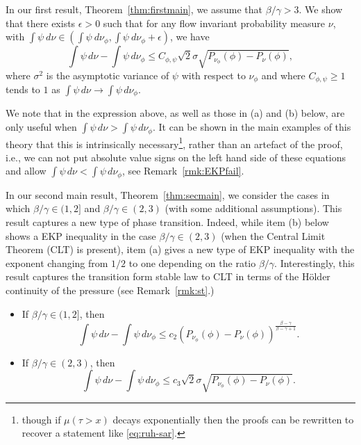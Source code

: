 \documentclass[12pt]{article}
\numberwithin{equation}{section}
\newcommand{\eps}{{\epsilon}}
\begin{document}
In our first result, Theorem~\ref{thm:firstmain}, we assume that $\beta / \gamma >3$. 
We show that there exists $\epsilon>0$ such that for any flow invariant probability measure $\nu$, with  
$\int\psi~d\nu\in \left(\int\psi~d\nu_\phi, \int\psi~d\nu_\phi+\eps\right)$, we have
 \begin{equation*}
 \int\psi\,d\nu-\int\psi\,d\nu_{\phi} 
     \le C_{\phi, \psi}  {\sqrt 2}\sigma\sqrt{P_{\nu_\phi}(\phi)-P_\nu(\phi)},
 \end{equation*}
 where $\sigma^2$ is the asymptotic variance of $\psi$ with respect to $\nu_{\phi}$ and where $C_{\phi, \psi} \geq 1$ tends to $1$ as $\int \psi \, d\nu \to \int \psi \, d\nu_{\phi}$.


We note that in the expression above, as well as those in (a) and (b) below, are only useful when $\int\psi\,d\nu>\int\psi\,d\nu_{\phi}$.  It can be shown in the main examples of this theory that this is intrinsically necessary\footnote{though if $\mu(\tau >x)$ decays exponentially then the proofs can be rewritten to recover a statement like \eqref{eq:ruh-sar}.}, rather than an artefact of the proof,  i.e., we can not put absolute value signs on the left hand side of these equations and allow $\int\psi\,d\nu<\int\psi\,d\nu_{\phi}$, see Remark~\ref {rmk:EKPfail}.

In our second main result, Theorem~\ref{thm:secmain}, we consider the cases in which $\beta/ \gamma \in (1,2]$ 
and $\beta / \gamma \in (2,3)$ (with some additional assumptions). This result captures a new type of phase transition. 
Indeed,  while item (b)  below shows a EKP inequality in the case $\beta/\gamma\in (2,3)$ (when the Central Limit Theorem (CLT) is present), 
item (a) gives a new type of EKP inequality with the exponent changing from $1/2$ to one depending on the 
ratio $\beta/\gamma$. Interestingly, this result captures the transition form stable law to CLT in terms 
of the H\"older continuity of the pressure (see Remark~\ref{rmk:st}.)



\begin{itemize}
 \item[(a)]  If $\beta/\gamma\in (1,2]$,
then
\[
 \int\psi\,d\nu-\int\psi\,d\nu_{\phi}\le c_2 (P_{\nu_\phi}(\phi)-P_\nu(\phi))^{\frac{\beta-\gamma}{\beta-\gamma+1}}.
 \]


\item[(b)] If $\beta/\gamma\in (2,3)$,  then  
\[
 \int\psi\,d\nu-\int\psi\,d\nu_{\phi}\le  c_3 {\sqrt 2}\sigma\sqrt{P_{\nu_\phi}(\phi)-P_\nu(\phi)}.
 \]
\end{itemize}
\end{document}
